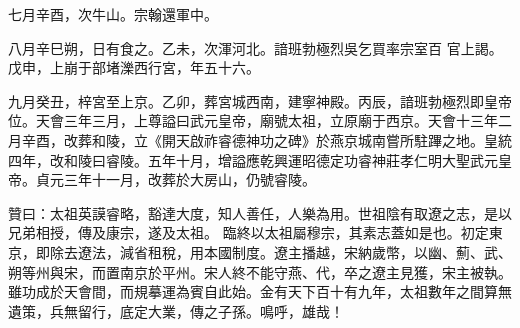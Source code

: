 \begin{pinyinscope}
 七月辛酉，次牛山。宗翰還軍中。



 八月辛巳朔，日有食之。乙未，次渾河北。諳班勃極烈吳乞買率宗室百
 官上謁。戊申，上崩于部堵濼西行宮，年五十六。



 九月癸丑，梓宮至上京。乙卯，葬宮城西南，建寧神殿。丙辰，諳班勃極烈即皇帝位。天會三年三月，上尊謚曰武元皇帝，廟號太祖，立原廟于西京。天會十三年二月辛酉，改葬和陵，立《開天啟祚睿德神功之碑》於燕京城南嘗所駐蹕之地。皇統四年，改和陵曰睿陵。五年十月，增謚應乾興運昭德定功睿神莊孝仁明大聖武元皇帝。貞元三年十一月，改葬於大房山，仍號睿陵。



 贊曰：太祖英謨睿略，豁達大度，知人善任，人樂為用。世祖陰有取遼之志，是以兄弟相授，傳及康宗，遂及太祖。
 臨終以太祖屬穆宗，其素志蓋如是也。初定東京，即除去遼法，減省租稅，用本國制度。遼主播越，宋納歲幣，以幽、薊、武、朔等州與宋，而置南京於平州。宋人終不能守燕、代，卒之遼主見獲，宋主被執。雖功成於天會間，而規摹運為賓自此始。金有天下百十有九年，太祖數年之間算無遺策，兵無留行，底定大業，傳之子孫。鳴呼，雄哉！



\end{pinyinscope}